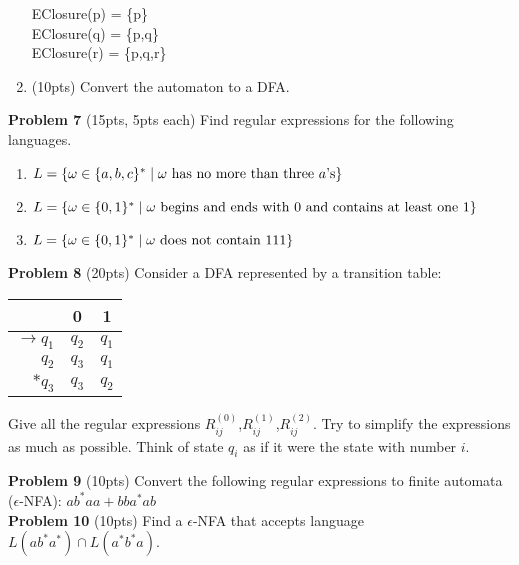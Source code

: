 \documentclass{article}
\begin{document}
\begin{enumerate}
EClosure(p) = \{p\}\\
EClosure(q) = \{p,q\}\\
EClosure(r) = \{p,q,r\}\\

        \item (10pts) Convert the automaton to a DFA.
    \end{enumerate}
    
\noindent \textbf{Problem 7} (15pts, 5pts each) Find regular expressions for the following languages.
\begin{enumerate}
    \item $L = \{ \omega \in \{ a,b,c \}^* \mid \omega \mbox{ has no more than three $a$'s} \}$
    \item $L = \{ \omega \in \{ 0,1 \}^* \mid \omega \mbox{ begins and ends with 0 and contains at least one 1} \}$
    \item $L = \{ \omega \in \{ 0,1 \}^* \mid \omega \mbox{ does not contain 111} \}$ 
\end{enumerate}

\noindent \textbf{Problem 8} (20pts) Consider a DFA represented by a transition table:
\begin{center}
\small
\begin{tabular}{r|c|c}
& 0 & 1 \\ \hline
$\rightarrow q_1$ & $q_2$ & $q_1$ \\ 
$q_2$ & $q_3$ & $q_1$ \\ 
$*q_3$ & $q_3$ & $q_2$
\end{tabular}
\end{center}
Give all the regular expressions $R^{(0)}_{ij}$,$R^{(1)}_{ij}$,$R^{(2)}_{ij}$. Try to simplify the expressions as much as possible.
Think of state $q_i$ as if it were the state with number $i$.

\noindent \newline \textbf{Problem 9} (10pts) Convert the following regular expressions to finite automata ($\epsilon$-NFA): $ab^*aa+bba^*ab$ \\

\noindent \textbf{Problem 10} (10pts) Find a $\epsilon$-NFA that accepts language $L(ab^*a^*)\cap L(a^*b^*a)$.
\end{document}
